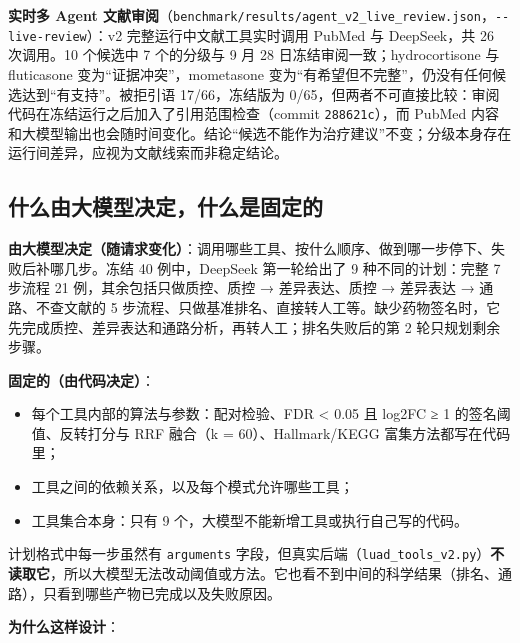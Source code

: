 \documentclass[
  10pt,
]{ctexart}
\providecommand{\tightlist}{%
  \setlength{\itemsep}{0pt}\setlength{\parskip}{0pt}}
\begin{document}
\textbf{实时多 Agent
文献审阅}（\texttt{benchmark/\allowbreak{}results/\allowbreak{}agent\_\allowbreak{}v2\_\allowbreak{}live\_\allowbreak{}review.\allowbreak{}json}，\texttt{-\/\allowbreak{}-live-review}）：v2
完整运行中文献工具实时调用 PubMed 与 DeepSeek，共 26 次调用。10 个候选中
7 个的分级与 9 月 28 日冻结审阅一致；hydrocortisone 与 fluticasone
变为``证据冲突''，mometasone
变为``有希望但不完整''，仍没有任何候选达到``有支持''。被拒引语
17/66，冻结版为
0/65，但两者不可直接比较：审阅代码在冻结运行之后加入了引用范围检查（commit
\texttt{288621c}），而 PubMed
内容和大模型输出也会随时间变化。结论``候选不能作为治疗建议''不变；分级本身存在运行间差异，应视为文献线索而非稳定结论。

\subsection{什么由大模型决定，什么是固定的}\label{ux4ec0ux4e48ux7531ux5927ux6a21ux578bux51b3ux5b9aux4ec0ux4e48ux662fux56faux5b9aux7684}

\textbf{由大模型决定（随请求变化）}：调用哪些工具、按什么顺序、做到哪一步停下、失败后补哪几步。冻结
40 例中，DeepSeek 第一轮给出了 9 种不同的计划：完整 7 步流程 21
例，其余包括只做质控、质控 → 差异表达、质控 → 差异表达 →
通路、不查文献的 5
步流程、只做基准排名、直接转人工等。缺少药物签名时，它先完成质控、差异表达和通路分析，再转人工；排名失败后的第
2 轮只规划剩余步骤。

\textbf{固定的（由代码决定）}：

\begin{itemize}
\tightlist
\item
  每个工具内部的算法与参数：配对检验、FDR \textless{} 0.05 且
  \textbar log2FC\textbar{} ≥ 1 的签名阈值、反转打分与 RRF 融合（k =
  60）、Hallmark/KEGG 富集方法都写在代码里；
\item
  工具之间的依赖关系，以及每个模式允许哪些工具；
\item
  工具集合本身：只有 9 个，大模型不能新增工具或执行自己写的代码。
\end{itemize}

计划格式中每一步虽然有 \texttt{arguments}
字段，但真实后端（\texttt{luad\_\allowbreak{}tools\_\allowbreak{}v2.\allowbreak{}py}）\textbf{不读取它}，所以大模型无法改动阈值或方法。它也看不到中间的科学结果（排名、通路），只看到哪些产物已完成以及失败原因。

\textbf{为什么这样设计}：
\end{document}
